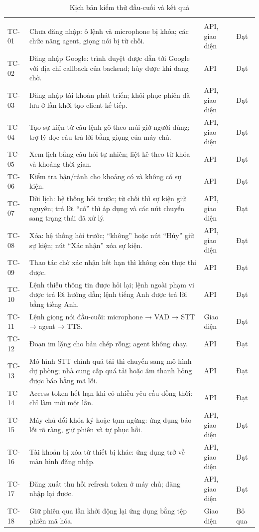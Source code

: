 \FloatBarrier
{\bang
\begin{longtable}{|C{1.3cm}|L{9.0cm}|L{2.3cm}|C{1.5cm}|}
\caption{Kịch bản kiểm thử đầu-cuối và kết quả}\label{tab:e2e-cases}\\\hline
{} &  &  & \\\hline
\endfirsthead
\hline{} &  &  & \\\hline
\endhead
TC-01 & Chưa đăng nhập: ô lệnh và microphone bị khóa; các chức năng agent, giọng nói bị từ chối. & API, giao diện & Đạt\\\hline
TC-02 & Đăng nhập Google: trình duyệt được dẫn tới Google với địa chỉ callback của backend; hủy được khi đang chờ. & API & Đạt\\\hline
TC-03 & Đăng nhập tài khoản phát triển; khôi phục phiên đã lưu ở lần khởi tạo client kế tiếp. & API, giao diện & Đạt\\\hline
TC-04 & Tạo sự kiện từ câu lệnh gõ theo múi giờ người dùng; trợ lý đọc câu trả lời bằng giọng của máy chủ. & API, giao diện & Đạt\\\hline
TC-05 & Xem lịch bằng câu hỏi tự nhiên; liệt kê theo từ khóa và khoảng thời gian. & API & Đạt\\\hline
TC-06 & Kiểm tra bận/rảnh cho khoảng có và không có sự kiện. & API & Đạt\\\hline
TC-07 & Dời lịch: hệ thống hỏi trước; từ chối thì sự kiện giữ nguyên; trả lời “có” thì áp dụng và các nút chuyển sang trạng thái đã xử lý. & API, giao diện & Đạt\\\hline
TC-08 & Xóa: hệ thống hỏi trước; “không” hoặc nút “Hủy” giữ sự kiện; nút “Xác nhận” xóa sự kiện. & API, giao diện & Đạt\\\hline
TC-09 & Thao tác chờ xác nhận hết hạn thì không còn thực thi được. & API & Đạt\\\hline
TC-10 & Lệnh thiếu thông tin được hỏi lại; lệnh ngoài phạm vi được trả lời hướng dẫn; lệnh tiếng Anh được trả lời bằng tiếng Anh. & API & Đạt\\\hline
TC-11 & Lệnh giọng nói đầu-cuối: microphone → VAD → STT → agent → TTS. & Giao diện & Đạt\\\hline
TC-12 & Đoạn im lặng cho bản chép rỗng; agent không chạy. & API & Đạt\\\hline
TC-13 & Mô hình STT chính quá tải thì chuyển sang mô hình dự phòng; nhà cung cấp quá tải hoặc âm thanh hỏng được báo bằng mã lỗi. & API & Đạt\\\hline
TC-14 & Access token hết hạn khi có nhiều yêu cầu đồng thời: chỉ làm mới một lần. & API & Đạt\\\hline
TC-15 & Máy chủ đổi khóa ký hoặc tạm ngừng: ứng dụng báo lỗi rõ ràng, giữ phiên và tự phục hồi. & API, giao diện & Đạt\\\hline
TC-16 & Tài khoản bị xóa từ thiết bị khác: ứng dụng trở về màn hình đăng nhập. & API, giao diện & Đạt\\\hline
TC-17 & Đăng xuất thu hồi refresh token ở máy chủ; đăng nhập lại được. & API, giao diện & Đạt\\\hline
TC-18 & Giữ phiên qua lần khởi động lại ứng dụng bằng tệp phiên mã hóa. & Giao diện & Bỏ qua\\\hline
\end{longtable}}
